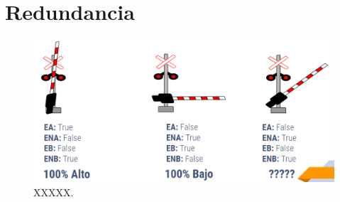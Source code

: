 \section{Redundancia}

\label{sec:VHDL}

\lipsum[1]

\begin{figure}[!h]
        \centering
        \includegraphics[width=1\textwidth]{Figuras/antagonica}
        \centering\caption{XXXXX.}
        \label{fig:redundancia_1}
    \end{figure}

\lipsum[1]
